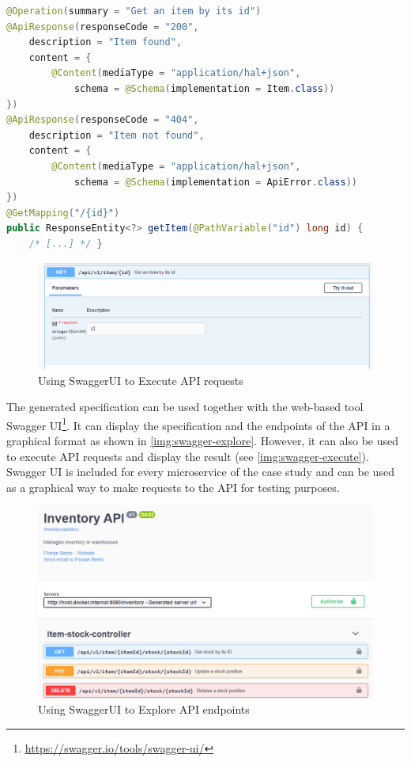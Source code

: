 \begin{lstlisting}[language=java, style=java-ext, caption={Java Annotations to Generate \acf{OAS} from Spring Controllers}, label={lst:oas-annotations}]
@Operation(summary = "Get an item by its id")
@ApiResponse(responseCode = "200", 
    description = "Item found", 
    content = {
        @Content(mediaType = "application/hal+json", 
            schema = @Schema(implementation = Item.class))
})
@ApiResponse(responseCode = "404", 
    description = "Item not found", 
    content = {
        @Content(mediaType = "application/hal+json", 
            schema = @Schema(implementation = ApiError.class))
})
@GetMapping("/{id}")
public ResponseEntity<?> getItem(@PathVariable("id") long id) { 
    /* [...] */ }
\end{lstlisting}

\begin{figure}[!htb]
    \includegraphics[width=\textwidth]{images/swagger-ui-execute.png}
    \caption{Using SwaggerUI to Execute \ac{API} requests}\label{img:swagger-execute}
\end{figure}

The generated specification can be used together with the web-based tool Swagger UI\footnote{\url{https://swagger.io/tools/swagger-ui/}}.
It can display the specification and the endpoints of the \ac{API} in a graphical format as shown in \autoref{img:swagger-explore}.
However, it can also be used to execute \ac{API} requests and display the result (see \autoref{img:swagger-execute}).
Swagger UI is included for every microservice of the case study and can be used as a graphical way to make requests to the \ac{API} for testing purposes.

\begin{figure}[!htb]
    \includegraphics[width=\textwidth]{images/swagger-ui-explore.png}
    \caption{Using SwaggerUI to Explore \ac{API} endpoints}\label{img:swagger-explore}    
\end{figure}

